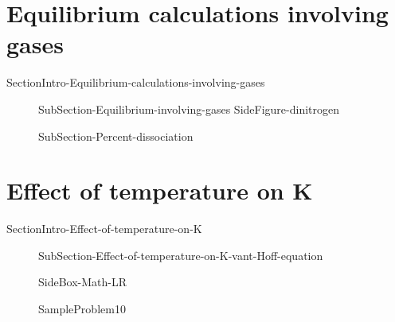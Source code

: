 \documentclass[main.tex]{subfiles}
\begin{document}
{\section{Equilibrium calculations involving gases}{SectionIntro-Equilibrium-calculations-involving-gases}
\sloppy\begin{description}
\item[] {SubSection-Equilibrium-involving-gases}
{SideFigure-dinitrogen}
\item[] {SubSection-Percent-dissociation}
\end{description}



\section{Effect of temperature on K}{SectionIntro-Effect-of-temperature-on-K}
\sloppy\begin{description}
\item[] {SubSection-Effect-of-temperature-on-K-vant-Hoff-equation}
\begin{marginfigure}[-25cm] {SideBox-Math-LR}\end{marginfigure}
{SampleProblem10}




\end{description}
 








}{}


\checkoddpage\ifoddpage \clearpage\thispagestyle{empty}\mbox{}\clearpage \else  \fi 
\end{document}
